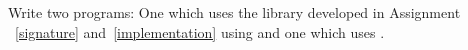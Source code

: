 Write two programs: One which uses the library developed in Assignment ~\ref{signature} and~\ref{implementation} using  and one which uses .
